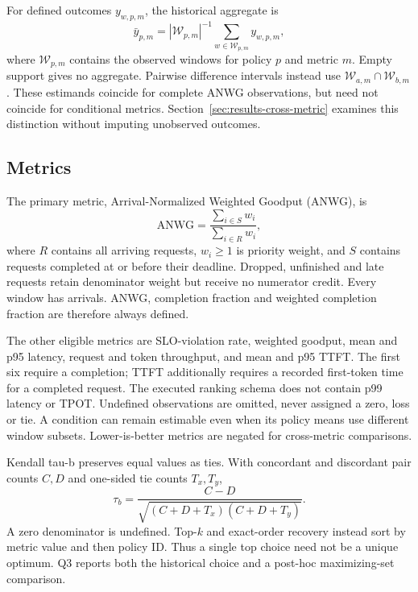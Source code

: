 For defined outcomes $y_{w,p,m}$, the historical aggregate is
\begin{equation}
 \bar y_{p,m}=|\mathcal W_{p,m}|^{-1}
 \sum_{w\in\mathcal W_{p,m}} y_{w,p,m},
\end{equation}
where $\mathcal W_{p,m}$ contains the observed windows for policy $p$
and metric $m$. Empty support gives no aggregate. Pairwise difference
intervals instead use $\mathcal W_{a,m}\cap\mathcal W_{b,m}$. These
estimands coincide for complete ANWG observations, but need not coincide
for conditional metrics. Section~\ref{sec:results-cross-metric} examines
this distinction without imputing unobserved outcomes.

\subsection{Metrics}\label{sec:metrics}
The primary metric, Arrival-Normalized Weighted Goodput (ANWG), is
\begin{equation}
 \mathrm{ANWG}=\frac{\sum_{i\in S} w_i}{\sum_{i\in R} w_i},
\end{equation}
where $R$ contains all arriving requests, $w_i\geq1$ is priority weight,
and $S$ contains requests completed at or before their deadline. Dropped,
unfinished and late requests retain denominator weight but receive no
numerator credit. Every window has arrivals. ANWG, completion fraction
and weighted completion fraction are therefore always defined.

The other eligible metrics are SLO-violation rate, weighted goodput, mean
and p95 latency, request and token throughput, and mean and p95 TTFT.
The first six require a completion; TTFT additionally requires a recorded
first-token time for a completed request. The executed ranking schema
does not contain p99 latency or TPOT. Undefined observations are omitted,
never assigned a zero, loss or tie. A condition can remain estimable even
when its policy means use different window subsets. Lower-is-better
metrics are negated for cross-metric comparisons.

Kendall tau-b preserves equal values as ties. With concordant and
discordant pair counts $C,D$ and one-sided tie counts $T_x,T_y$,
\begin{equation}
 \tau_b=\frac{C-D}{\sqrt{(C+D+T_x)(C+D+T_y)}}.
\end{equation}
A zero denominator is undefined. Top-$k$ and exact-order recovery instead
sort by metric value and then policy ID. Thus a single top choice need
not be a unique optimum. Q3 reports both the historical choice and a
post-hoc maximizing-set comparison.

